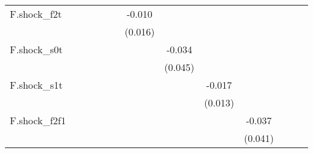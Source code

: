 {\begin{tabular}{l*{12}{c}}
\addlinespace
F.shock\_f2t &                     &                     &                     &                     &                     &      -0.010         &                     &                     &                     &                     &                     &                     \\
            &                     &                     &                     &                     &                     &     (0.016)         &                     &                     &                     &                     &                     &                     \\
\addlinespace
F.shock\_s0t &                     &                     &                     &                     &                     &                     &      -0.034         &                     &                     &                     &                     &                     \\
            &                     &                     &                     &                     &                     &                     &     (0.045)         &                     &                     &                     &                     &                     \\
\addlinespace
F.shock\_s1t &                     &                     &                     &                     &                     &                     &                     &      -0.017         &                     &                     &                     &                     \\
            &                     &                     &                     &                     &                     &                     &                     &     (0.013)         &                     &                     &                     &                     \\
\addlinespace
F.shock\_f2f1&                     &                     &                     &                     &                     &                     &                     &                     &      -0.037         &                     &                     &                     \\
            &                     &                     &                     &                     &                     &                     &                     &                     &     (0.041)         &                     &                     &                     \\

\end{tabular}}

